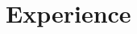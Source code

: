 \documentclass{article}
\begin{document}
\section{Experience}
\begin{itemize}
\end{itemize}
\end{document}
